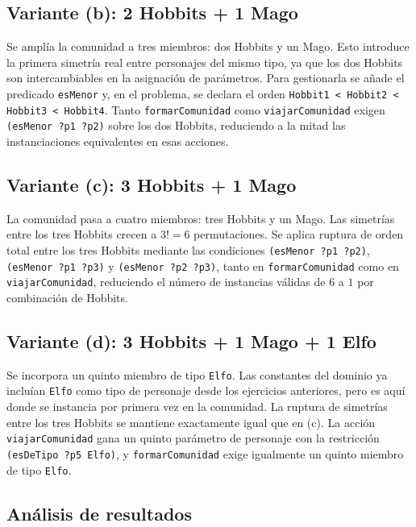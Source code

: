 \documentclass[10pt]{article}
\begin{document}
\subsection{Variante (b): 2 Hobbits + 1 Mago}

Se amplía la comunidad a tres miembros: dos Hobbits y un Mago. Esto introduce la primera simetría real entre personajes del mismo tipo, ya que los dos Hobbits son intercambiables en la asignación de parámetros. Para gestionarla se añade el predicado \texttt{esMenor} y, en el problema, se declara el orden \texttt{Hobbit1 < Hobbit2 < Hobbit3 < Hobbit4}. Tanto \texttt{formarComunidad} como \texttt{viajarComunidad} exigen \texttt{(esMenor ?p1 ?p2)} sobre los dos Hobbits, reduciendo a la mitad las instanciaciones equivalentes en esas acciones.

\subsection{Variante (c): 3 Hobbits + 1 Mago}

La comunidad pasa a cuatro miembros: tres Hobbits y un Mago. Las simetrías entre los tres Hobbits crecen a $3! = 6$ permutaciones. Se aplica ruptura de orden total entre los tres Hobbits mediante las condiciones \texttt{(esMenor ?p1 ?p2)}, \texttt{(esMenor ?p1 ?p3)} y \texttt{(esMenor ?p2 ?p3)}, tanto en \texttt{formarComunidad} como en \texttt{viajarComunidad}, reduciendo el número de instancias válidas de $6$ a $1$ por combinación de Hobbits.

\subsection{Variante (d): 3 Hobbits + 1 Mago + 1 Elfo}

Se incorpora un quinto miembro de tipo \texttt{Elfo}. Las constantes del dominio ya incluían \texttt{Elfo} como tipo de personaje desde los ejercicios anteriores, pero es aquí donde se instancia por primera vez en la comunidad. La ruptura de simetrías entre los tres Hobbits se mantiene exactamente igual que en (c). La acción \texttt{viajarComunidad} gana un quinto parámetro de personaje con la restricción \texttt{(esDeTipo ?p5 Elfo)}, y \texttt{formarComunidad} exige igualmente un quinto miembro de tipo \texttt{Elfo}.

\subsection{Análisis de resultados}
\end{document}
